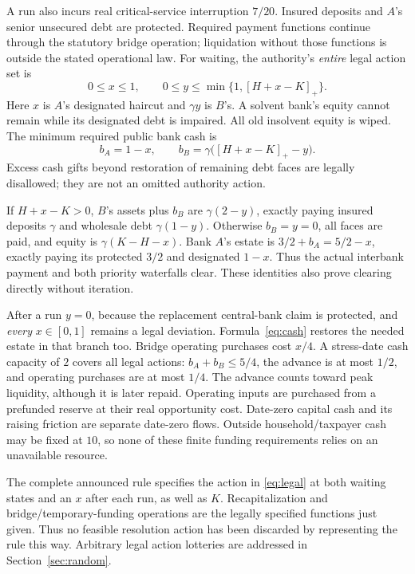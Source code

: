 \documentclass[11pt,a4paper]{article}
\numberwithin{equation}{section}
\theoremstyle{definition}
\begin{document}
A run also incurs real critical-service interruption \(7/20\). Insured
deposits and \(A\)'s senior unsecured debt are protected. Required payment
functions continue through the statutory bridge operation; liquidation
without those functions is outside the stated operational law.
For waiting, the authority's \emph{entire} legal action set is
\begin{equation}\label{eq:legal}
 0\le x\le1,\qquad
 0\le y\le\min\{1,[H+x-K]_+\}.
\end{equation}
Here \(x\) is \(A\)'s designated haircut and \(\gamma y\) is \(B\)'s.
A solvent bank's equity cannot remain while its designated debt is
impaired. All old insolvent equity is wiped. The minimum required public
bank cash is
\begin{equation}\label{eq:cash}
 b_A=1-x,\qquad b_B=\gamma\bigl([H+x-K]_+-y\bigr).
\end{equation}
Excess cash gifts beyond restoration of remaining debt faces are legally
disallowed; they are not an omitted authority action.

If \(H+x-K>0\), \(B\)'s assets plus \(b_B\) are
\(\gamma(2-y)\), exactly paying insured deposits \(\gamma\) and wholesale
debt \(\gamma(1-y)\). Otherwise \(b_B=y=0\), all faces are paid, and
equity is \(\gamma(K-H-x)\). Bank \(A\)'s estate is
\(3/2+b_A=5/2-x\), exactly paying its protected \(3/2\) and designated
\(1-x\). Thus the actual interbank payment and both priority waterfalls
clear. These identities also prove clearing directly without iteration.

After a run \(y=0\), because the replacement central-bank claim is
protected, and \emph{every} \(x\in[0,1]\) remains a legal deviation.
Formula~\eqref{eq:cash} restores the needed estate in that branch too.
Bridge operating purchases cost \(x/4\). A stress-date cash capacity of
\(2\) covers all legal actions: \(b_A+b_B\le5/4\), the advance is at most
\(1/2\), and operating purchases are at most \(1/4\). The advance counts
toward peak liquidity, although it is later repaid. Operating inputs are
purchased from a prefunded reserve at their real opportunity cost.
Date-zero capital cash and its raising friction are separate date-zero
flows. Outside household/taxpayer cash may be fixed at \(10\), so none
of these finite funding requirements relies on an unavailable resource.

The complete announced rule specifies the action in
\eqref{eq:legal} at both waiting states and an \(x\) after each run,
as well as \(K\). Recapitalization and bridge/temporary-funding operations
are the legally specified functions just given. Thus no feasible
resolution action has been discarded by representing the rule this way.
Arbitrary legal action lotteries are addressed in Section~\ref{sec:random}.
\end{document}
